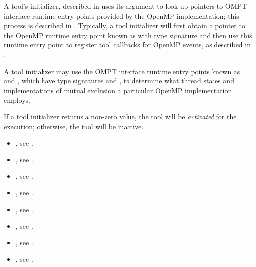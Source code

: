 A tool's initializer, described in 
uses its argument  to look up pointers
to OMPT interface runtime entry points provided by the OpenMP
implementation; this process is described in .
Typically, a tool initializer will first
obtain a pointer to the OpenMP runtime entry point known as
 with type signature
 and then use this runtime entry point to
register tool callbacks for OpenMP events, as described in
.

A tool initializer may use the OMPT interface runtime
entry points known as  and
, which have type signatures
 and
, to determine what thread
states and implementations of mutual exclusion a particular OpenMP
implementation employs.


If a tool initializer returns a non-zero value, the tool will be
\emph{activated} for the execution; otherwise, the tool will be
inactive.

\crossreferences
\begin{itemize}
\item {}, see
  .
\item {}, see .
\item {}, see .
\item {}, see .
\item {}, see   .
\item {}, see .
\item {}, see .
\item {}, see .
\end{itemize}


\label{sec:ompt-bind}

